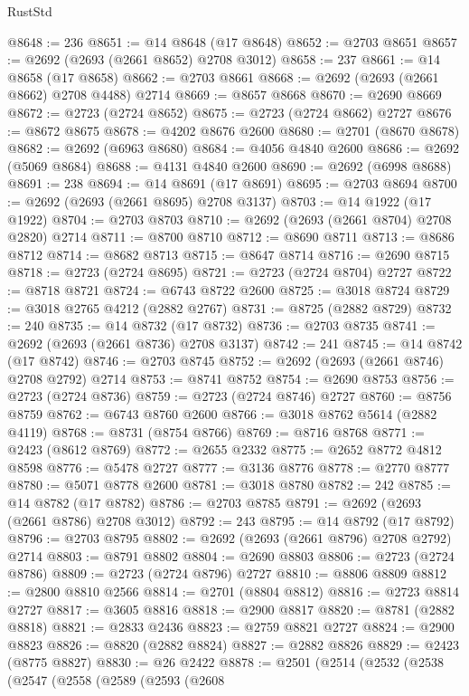 \begin{lexlean}{RustStd}
\begin{coremodule}
@8648 := 236
@8651 := @14 @8648 (@17 @8648)
@8652 := @2703 @8651
@8657 := @2692 (@2693 (@2661 @8652) @2708 @3012)
@8658 := 237
@8661 := @14 @8658 (@17 @8658)
@8662 := @2703 @8661
@8668 := @2692 (@2693 (@2661 @8662) @2708 @4488) @2714
@8669 := @8657 @8668
@8670 := @2690 @8669
@8672 := @2723 (@2724 @8652)
@8675 := @2723 (@2724 @8662) @2727
@8676 := @8672 @8675
@8678 := @4202 @8676 @2600
@8680 := @2701 (@8670 @8678)
@8682 := @2692 (@6963 @8680)
@8684 := @4056 @4840 @2600
@8686 := @2692 (@5069 @8684)
@8688 := @4131 @4840 @2600
@8690 := @2692 (@6998 @8688)
@8691 := 238
@8694 := @14 @8691 (@17 @8691)
@8695 := @2703 @8694
@8700 := @2692 (@2693 (@2661 @8695) @2708 @3137)
@8703 := @14 @1922 (@17 @1922)
@8704 := @2703 @8703
@8710 := @2692 (@2693 (@2661 @8704) @2708 @2820) @2714
@8711 := @8700 @8710
@8712 := @8690 @8711
@8713 := @8686 @8712
@8714 := @8682 @8713
@8715 := @8647 @8714
@8716 := @2690 @8715
@8718 := @2723 (@2724 @8695)
@8721 := @2723 (@2724 @8704) @2727
@8722 := @8718 @8721
@8724 := @6743 @8722 @2600
@8725 := @3018 @8724
@8729 := @3018 @2765 @4212 (@2882 @2767)
@8731 := @8725 (@2882 @8729)
@8732 := 240
@8735 := @14 @8732 (@17 @8732)
@8736 := @2703 @8735
@8741 := @2692 (@2693 (@2661 @8736) @2708 @3137)
@8742 := 241
@8745 := @14 @8742 (@17 @8742)
@8746 := @2703 @8745
@8752 := @2692 (@2693 (@2661 @8746) @2708 @2792) @2714
@8753 := @8741 @8752
@8754 := @2690 @8753
@8756 := @2723 (@2724 @8736)
@8759 := @2723 (@2724 @8746) @2727
@8760 := @8756 @8759
@8762 := @6743 @8760 @2600
@8766 := @3018 @8762 @5614 (@2882 @4119)
@8768 := @8731 (@8754 @8766)
@8769 := @8716 @8768
@8771 := @2423 (@8612 @8769)
@8772 := @2655 @2332
@8775 := @2652 @8772 @4812 @8598
@8776 := @5478 @2727
@8777 := @3136 @8776
@8778 := @2770 @8777
@8780 := @5071 @8778 @2600
@8781 := @3018 @8780
@8782 := 242
@8785 := @14 @8782 (@17 @8782)
@8786 := @2703 @8785
@8791 := @2692 (@2693 (@2661 @8786) @2708 @3012)
@8792 := 243
@8795 := @14 @8792 (@17 @8792)
@8796 := @2703 @8795
@8802 := @2692 (@2693 (@2661 @8796) @2708 @2792) @2714
@8803 := @8791 @8802
@8804 := @2690 @8803
@8806 := @2723 (@2724 @8786)
@8809 := @2723 (@2724 @8796) @2727
@8810 := @8806 @8809
@8812 := @2800 @8810 @2566
@8814 := @2701 (@8804 @8812)
@8816 := @2723 @8814 @2727
@8817 := @3605 @8816
@8818 := @2900 @8817
@8820 := @8781 (@2882 @8818)
@8821 := @2833 @2436
@8823 := @2759 @8821 @2727
@8824 := @2900 @8823
@8826 := @8820 (@2882 @8824)
@8827 := @2882 @8826
@8829 := @2423 (@8775 @8827)
@8830 := @26 @2422
@8878 := @2501
    (@2514
      (@2532
        (@2538
          (@2547
            (@2558
              (@2589
                (@2593
                  (@2608

\end{coremodule}
\end{lexlean}
